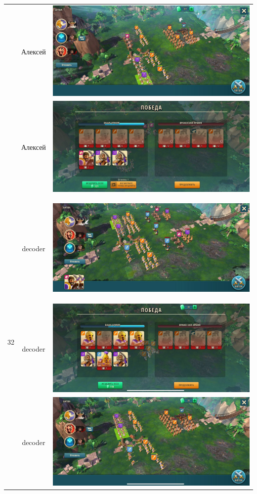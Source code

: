 \begin{longtable}{|c|c|c|}
	& Алексей &
	\includegraphics[width=0.75\linewidth]{./parts/media/TreasureHunt/32/alexey/photo_2022-04-14_13-54-53.jpg} \\
	& Алексей &
	\includegraphics[width=0.75\linewidth]{./parts/media/TreasureHunt/32/alexey/photo_2022-04-14_13-54-58.jpg} \\
	\hline
	\multirow{16}{*}{32} & decoder &
	\hypertarget{fight32}{\includegraphics[width=0.75\linewidth]{./parts/media/TreasureHunt/32/decoder/photo_2022-04-07_10-00-59.jpg}} \\
	& decoder &
	\includegraphics[width=0.75\linewidth]{./parts/media/TreasureHunt/32/decoder/photo_2022-04-07_10-01-57.jpg} \\
	& decoder &
	\includegraphics[width=0.75\linewidth]{./parts/media/TreasureHunt/32/decoder/photo_2022-04-07_10-01-54.jpg} \\

\end{longtable}
